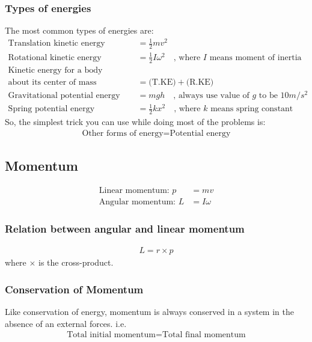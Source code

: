 \documentclass[12pt,a4paper]{article}
\begin{document}
\subsubsection{Types of energies}
The most common types of energies are:
\begin{align}
\text{Translation kinetic energy (T.KE)} &= \frac{1}{2}m v^{2} \\
\text{Rotational kinetic energy (R.KE)} &= \frac{1}{2} I \omega^{2} \quad \text{, where $I$ means moment of inertia}\\
\text{Kinetic energy for a body }& \nonumber\\
\text{about its center of mass} &= \text{(T.KE)} + \text{(R.KE)} \\
\text{Gravitational potential energy} &= mgh \quad \text{, always use value of $g$ to be $10m/s^{2}$} \\
\text{Spring potential energy} &= \frac{1}{2}k x^{2} \quad \text{, where $k$ means spring constant}
\end{align}
So, the simplest trick you can use while doing most of the problems is:
\begin{align*}
\text{Other forms of energy} = \text{Potential energy}
\end{align*}

\subsection{Momentum}
\begin{align*}
\text{Linear momentum: } p &= mv \\
\text{Angular momentum: } L &= I\omega
\end{align*}

\subsubsection{Relation between angular and linear momentum}
\begin{align}
L = r \times p
\end{align}
where $\times$ is the cross-product. 

\subsubsection{Conservation of Momentum}
Like conservation of energy, momentum is always conserved in a system in the absence of an external forces. i.e.
\begin{align*}
\text{Total initial momentum} = \text{Total final momentum}
\end{align*}
\end{document}
